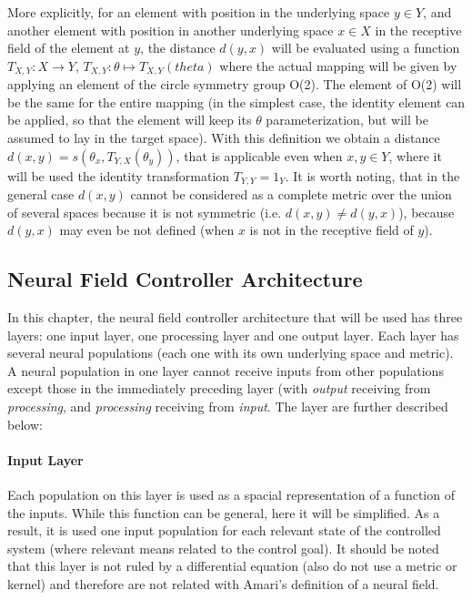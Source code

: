 More explicitly, for an element with position in the underlying space
$y \in Y$, and another element with position in another underlying
space $x \in X$ in the receptive field of the element at $y$, the
distance $d(y,x)$ will be evaluated using a function $T_{X,Y}: X
\rightarrow Y$, $T_{X,Y}:\theta \mapsto T_{X,Y}(theta)$ where the
actual mapping will be given by applying an element of the circle
symmetry group O(2). The element of O(2) will be the same for the
entire mapping (in the simplest case, the identity element can be
applied, so that the element will keep its $\theta$ parameterization,
but will be assumed to lay in the target space). With this definition
we obtain a distance $d(x,y)=s(\theta_x,T_{Y,X}(\theta_y))$, that is
applicable even when $x,y \in Y$, where it will be used the identity
transformation $T_{Y,Y}=1_Y$. It is worth noting, that in the general
case $d(x,y)$ cannot be considered as a complete metric over the union
of several spaces because it is not symmetric (i.e. $d(x,y) \neq
d(y,x)$), because $d(y,x)$ may even be not defined (when $x$ is not in
the receptive field of $y$).


\subsection{Neural Field Controller Architecture}
In this chapter, the neural field controller architecture that will be
used has three layers: one input layer, one processing layer and one
output layer. Each layer has several neural populations (each one with
its own underlying space and metric). A neural population in one layer
cannot receive inputs from other populations except those in the
immediately preceding layer (with \emph{output} receiving from
\emph{processing}, and \emph{processing} receiving from
\emph{input}. The layer are further described below:

\paragraph{Input Layer}
Each population on this layer is used as a spacial representation of a
function of the inputs. While this function can be general, here it
will be simplified. As a result, it is used one input population for
each relevant state of the controlled system (where relevant means
related to the control goal). It should be noted that this layer is
not ruled by a differential equation (also do not use a metric or
kernel) and therefore are not related with Amari's definition of a
neural field.

